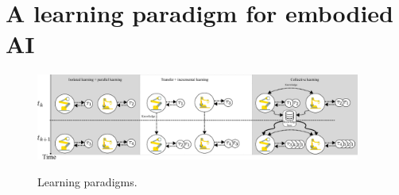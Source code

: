 %
%

\section{A learning paradigm for embodied AI}
\begin{figure}[!t]
	\centering
	\hspace*{\fill}
	\includegraphics[width= 0.95\textwidth]{fig/learning_paradigms_v3.pdf} \label{fig:isolated_learning}
	\hspace*{\fill}
	\caption[] {\label{fig:learning_paradigms} Learning paradigms.}
\end{figure}
